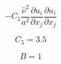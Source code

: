 

\begin{equation}
-C_5 \frac{\hat \nu^2}{a^2} \frac{\partial u_i}{\partial x_j}
\frac{\partial u_i}{\partial x_j}
\end{equation}

\begin{equation}
C_5=3.5
\end{equation}

\begin{equation}
B=1
\end{equation}


